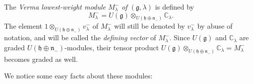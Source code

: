 \documentclass[etingof-lie.tex]{subfiles}
\begin{document}
\begin{definition}
The \textit{Verma lowest-weight module }$M_{\lambda}^{-}$ \textit{of }$\left(
\mathfrak{g},\lambda\right)  $ is defined by%
\[
M_{\lambda}^{-}=U\left(  \mathfrak{g}\right)  \otimes_{U\left(  \mathfrak{h}%
\oplus\mathfrak{n}_{-}\right)  }\mathbb{C}_{\lambda}.
\]
The element $1\otimes_{U\left(  \mathfrak{h}\oplus\mathfrak{n}_{-}\right)
}v_{\lambda}^{-}$ of $M_{\lambda}^{-}$ will still be denoted by $v_{\lambda
}^{-}$ by abuse of notation, and will be called the \textit{defining vector}
of $M_{\lambda}^{-}$. Since $U\left(  \mathfrak{g}\right)  $ and
$\mathbb{C}_{\lambda}$ are graded $U\left(  \mathfrak{h}\oplus\mathfrak{n}%
_{-}\right)  $-modules, their tensor product $U\left(  \mathfrak{g}\right)
\otimes_{U\left(  \mathfrak{h}\oplus\mathfrak{n}_{-}\right)  }\mathbb{C}%
_{\lambda}=M_{\lambda}^{-}$ becomes graded as well.
\end{definition}

We notice some easy facts about these modules:
\end{document}
